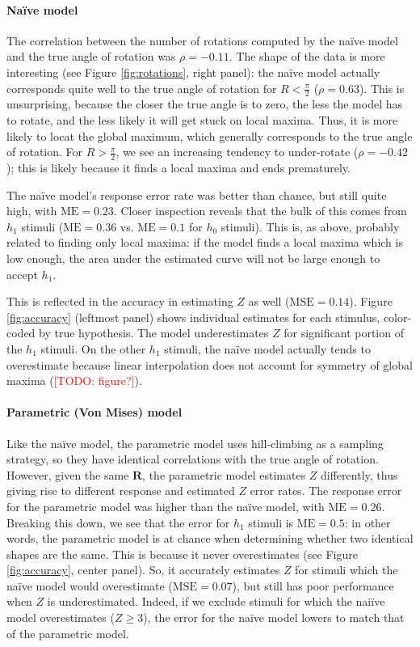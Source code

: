 \documentclass{article} %
\newcommand{\TODO}[1]{\textcolor{red}{[TODO: #1]}}
\begin{document}
\paragraph{Na\"ive model} 

The correlation between the number of rotations computed by the
na\"ive model and the true angle of rotation was $\rho=-0.11$. The
shape of the data is more interesting (see Figure \ref{fig:rotations},
right panel): the na\"ive model actually corresponds quite well to the
true angle of rotation for $R<\frac{\pi}{2}$ ($\rho=0.63$). This is
unsurprising, because the closer the true angle is to zero, the less
the model has to rotate, and the less likely it will get stuck on
local maxima. Thus, it is more likely to locat the global maximum,
which generally corresponds to the true angle of rotation. For
$R>\frac{\pi}{2}$, we see an increasing tendency to under-rotate
($\rho=-0.42$); this is likely because it finds a local maxima and
ends prematurely.

The na\"ive model's response error rate was better than chance, but
still quite high, with $\mathrm{ME}=0.23$. Closer inspection reveals
that the bulk of this comes from $h_1$ stimuli ($\mathrm{ME}=0.36$
vs. $\mathrm{ME}=0.1$ for $h_0$ stimuli). This is, as above, probably
related to finding only local maxima: if the model finds a local
maxima which is low enough, the area under the estimated curve will
not be large enough to accept $h_1$.

This is reflected in the accuracy in estimating $Z$ as well
($\mathrm{MSE}=0.14$). Figure \ref{fig:accuracy} (leftmost panel)
shows individual estimates for each stimulus, color-coded by true
hypothesis. The model underestimates $Z$ for significant portion of
the $h_1$ stimuli. On the other $h_1$ stimuli, the na\"ive model
actually tends to overestimate because linear interpolation does not
account for symmetry of global maxima (\TODO{figure?}).

\paragraph{Parametric (Von Mises) model}

Like the na\"ive model, the parametric model uses hill-climbing as a
sampling strategy, so they have identical correlations with the true
angle of rotation. However, given the same $\mathbf{R}$, the
parametric model estimates $Z$ differently, thus giving rise to
different response and estimated $Z$ error rates. The response error
for the parametric model was higher than the na\"ive model, with
$\mathrm{ME}=0.26$. Breaking this down, we see that the error for
$h_1$ stimuli is $\mathrm{ME}=0.5$: in other words, the parametric
model is at chance when determining whether two identical shapes are
the same. This is because it never overestimates (see Figure
\ref{fig:accuracy}, center panel). So, it accurately estimates $Z$ for
stimuli which the na\"ive model would overestimate
($\mathrm{MSE}=0.07$), but still has poor performance when $Z$ is
underestimated. Indeed, if we exclude stimuli for which the nai\"ive
model overestimates ($Z\geq 3$), the error for the na\"ive model
lowers to match that of the parametric model.
\end{document}

